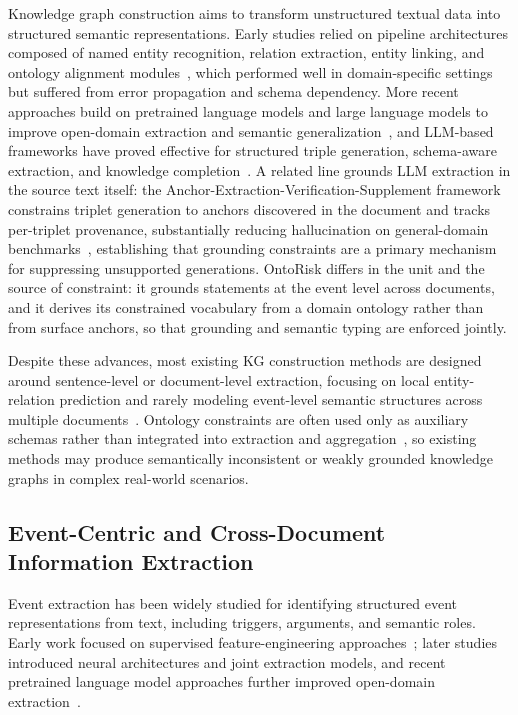 \documentclass[a4paper,fleqn]{cas-dc}
\begin{document}
Knowledge graph construction aims to transform unstructured textual data into
structured semantic representations.
Early studies relied on pipeline architectures composed of named
entity recognition, relation extraction, entity linking, and ontology alignment
modules~\cite{10.1145/3447772}, which performed well in domain-specific
settings but suffered from error propagation and schema dependency.
More recent approaches build on pretrained language models and large
language models to improve open-domain extraction and semantic
generalization~\cite{10.5555/3495724.3495883}, and LLM-based frameworks
have proved effective for structured triple generation, schema-aware
extraction, and knowledge completion~\cite{chepurova-etal-2024-prompt}.
A related line grounds LLM extraction in the source text itself: the
Anchor-Extraction-Verification-Supplement framework constrains triplet
generation to anchors discovered in the document and tracks per-triplet
provenance, substantially reducing hallucination on general-domain
benchmarks~\cite{computers15030178}, establishing that grounding
constraints are a primary mechanism for suppressing unsupported
generations. OntoRisk differs in the unit and the source of
constraint: it grounds statements at the event level across
documents, and it derives its constrained vocabulary from a domain
ontology rather than from surface anchors, so that grounding and
semantic typing are enforced jointly.

Despite these advances, most existing KG construction methods are designed
around sentence-level or document-level extraction, focusing on local
entity-relation prediction and rarely modeling event-level semantic
structures across multiple documents~\cite{gao-etal-2024-harvesting}.
Ontology constraints are often used only as auxiliary schemas rather
than integrated into extraction and aggregation~\cite{10.1145/3618295},
so existing methods may produce semantically inconsistent or weakly
grounded knowledge graphs in complex real-world scenarios.

\subsection{Event-Centric and Cross-Document Information Extraction}

Event extraction has been widely studied for identifying structured event
representations from text, including triggers, arguments, and semantic roles.
Early work focused on supervised feature-engineering
approaches~\cite{ahn-2006-stages}; later studies introduced neural
architectures and joint extraction models, and recent pretrained
language model approaches further improved open-domain
extraction~\cite{li2025eventextractionlargelanguage}.
\end{document}
